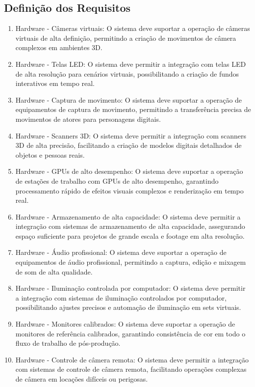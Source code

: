 \subsection{Definição dos Requisitos}

\begin{enumerate}
  \item Hardware - Câmeras virtuais: O sistema deve suportar a operação de câmeras virtuais de alta definição, permitindo a criação de movimentos de câmera complexos em ambientes 3D.
  \item Hardware - Telas LED: O sistema deve permitir a integração com telas LED de alta resolução para cenários virtuais, possibilitando a criação de fundos interativos em tempo real.
  \item Hardware - Captura de movimento: O sistema deve suportar a operação de equipamentos de captura de movimento, permitindo a transferência precisa de movimentos de atores para personagens digitais.
  \item Hardware - Scanners 3D: O sistema deve permitir a integração com scanners 3D de alta precisão, facilitando a criação de modelos digitais detalhados de objetos e pessoas reais.
  \item Hardware - GPUs de alto desempenho: O sistema deve suportar a operação de estações de trabalho com GPUs de alto desempenho, garantindo processamento rápido de efeitos visuais complexos e renderização em tempo real.
  \item Hardware - Armazenamento de alta capacidade: O sistema deve permitir a integração com sistemas de armazenamento de alta capacidade, assegurando espaço suficiente para projetos de grande escala e footage em alta resolução.
  \item Hardware - Áudio profissional: O sistema deve suportar a operação de equipamentos de áudio profissional, permitindo a captura, edição e mixagem de som de alta qualidade.
  \item Hardware - Iluminação controlada por computador: O sistema deve permitir a integração com sistemas de iluminação controlados por computador, possibilitando ajustes precisos e automação de iluminação em sets virtuais.
  \item Hardware - Monitores calibrados: O sistema deve suportar a operação de monitores de referência calibrados, garantindo consistência de cor em todo o fluxo de trabalho de pós-produção.
  \item Hardware - Controle de câmera remota: O sistema deve permitir a integração com sistemas de controle de câmera remota, facilitando operações complexas de câmera em locações difíceis ou perigosas.

\end{enumerate}
